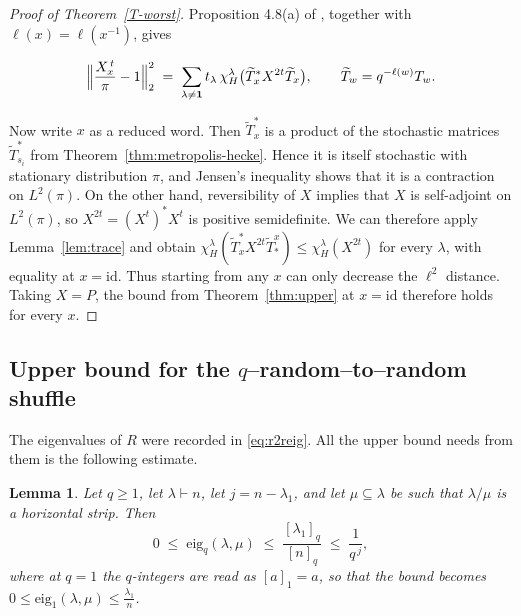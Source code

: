 \documentclass[11pt]{article}
\theoremstyle{plain}  %
\newtheorem{lemma}[theorem]{Lemma}
\newcommand{\eig}{\text{eig}} %
\begin{document}
\begin{proof}[Proof of Theorem~\ref{T-worst}]
Proposition 4.8(a) of \cite{DiaconisRam2000}, together with
$\ell(x) = \ell(x^{-1})$, gives

$$
  \Bigl\|\frac{X^{\,t}_{x}}{\pi}-1\Bigr\|_2^{2}
  \;=\; \sum_{\lambda \ne \mathbf{1}}
        t_\lambda\,\chi^{\lambda}_{H}
        \bigl(\widetilde{T}_{x}^{*}X^{2t}\widetilde{T}_{x}\bigr),
  \qquad \widetilde{T}_{w} = q^{-\ell(w)}T_{w} .
$$

Now write $x$ as a reduced word. Then $\widetilde{T}^{*}_x$ is a product of the
stochastic matrices $\widetilde{T}^*_{s_i}$ from
Theorem~\ref{thm:metropolis-hecke}. Hence it is itself stochastic with stationary
distribution $\pi$, and Jensen's inequality shows that it is a contraction on
$L^{2}(\pi)$. On the other hand, reversibility of $X$ implies that $X$ is
self-adjoint on $L^{2}(\pi)$, so
$X^{2t} = (X^{t})^{*}X^{t}$ is positive semidefinite. We can therefore apply
Lemma~\ref{lem:trace} and obtain
$\chi^{\lambda}_{H}(\widetilde{T}_{x}^{*}X^{2t}\widetilde{T}_{*}^{x})
\le \chi^{\lambda}_{H}(X^{2t})$ for every $\lambda$, with equality at
$x = \mathrm{id}$. Thus starting from any $x$ can only decrease the
$\ell^2$ distance. Taking $X = P$, the bound from
Theorem~\ref{thm:upper} at $x = \mathrm{id}$ therefore holds for every $x$.
\end{proof}



\subsection{Upper bound for the \texorpdfstring{$q$--random--to--random}{q-random-to-random} shuffle}\label{sec:r2r-upper}


The eigenvalues of $R$ were recorded in \eqref{eq:r2reig}. All the upper bound needs from
them is the following estimate.




\begin{lemma}\label{lem:r2rbounds}
Let $q \ge 1$, let $\lambda \vdash n$, let
$j = n-\lambda_1$, and let $\mu \subseteq \lambda$ be such that $\lambda/\mu$
is a horizontal strip. Then
$$
  0 \;\le\; \eig_q(\lambda,\mu) \;\le\; \frac{[\lambda_1]_q}{[n]_q}
    \;\le\; \frac{1}{q^{\,j}} ,
$$
where at $q=1$ the $q$-integers are read as $[a]_1 = a$, so that the bound
becomes $0 \le \eig_1(\lambda,\mu) \le \frac{\lambda_1}{n}$.
\end{lemma}
\end{document}
